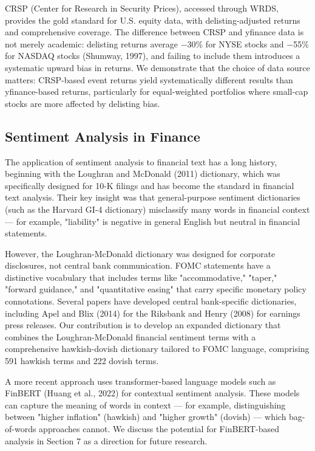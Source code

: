 CRSP (Center for Research in Security Prices), accessed through WRDS, provides the gold standard for U.S. equity data, with delisting-adjusted returns and comprehensive coverage. The difference between CRSP and yfinance data is not merely academic: delisting returns average $-$30\% for NYSE stocks and $-$55\% for NASDAQ stocks (Shumway, 1997), and failing to include them introduces a systematic upward bias in returns. We demonstrate that the choice of data source matters: CRSP-based event returns yield systematically different results than yfinance-based returns, particularly for equal-weighted portfolios where small-cap stocks are more affected by delisting bias.

\subsection{Sentiment Analysis in Finance}

The application of sentiment analysis to financial text has a long history, beginning with the Loughran and McDonald (2011) dictionary, which was specifically designed for 10-K filings and has become the standard in financial text analysis. Their key insight was that general-purpose sentiment dictionaries (such as the Harvard GI-4 dictionary) misclassify many words in financial context --- for example, "liability" is negative in general English but neutral in financial statements.

However, the Loughran-McDonald dictionary was designed for corporate disclosures, not central bank communication. FOMC statements have a distinctive vocabulary that includes terms like "accommodative," "taper," "forward guidance," and "quantitative easing" that carry specific monetary policy connotations. Several papers have developed central bank-specific dictionaries, including Apel and Blix (2014) for the Riksbank and Henry (2008) for earnings press releases. Our contribution is to develop an expanded dictionary that combines the Loughran-McDonald financial sentiment terms with a comprehensive hawkish-dovish dictionary tailored to FOMC language, comprising 591 hawkish terms and 222 dovish terms.

A more recent approach uses transformer-based language models such as FinBERT (Huang et al., 2022) for contextual sentiment analysis. These models can capture the meaning of words in context --- for example, distinguishing between "higher inflation" (hawkish) and "higher growth" (dovish) --- which bag-of-words approaches cannot. We discuss the potential for FinBERT-based analysis in Section 7 as a direction for future research.


